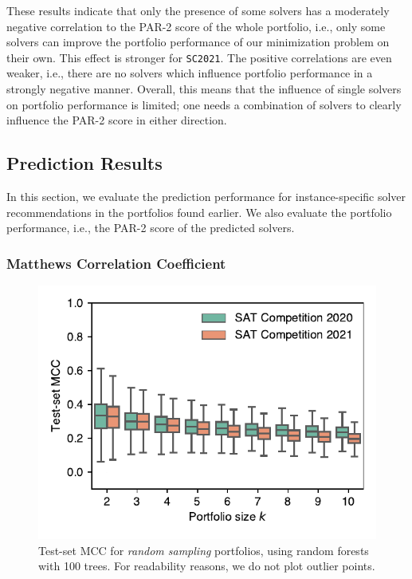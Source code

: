 \documentclass[conference]{IEEEtran}
\begin{document}
These results indicate that only the presence of some solvers has a moderately negative correlation to the PAR-2 score of the whole portfolio, i.e., only some solvers can improve the portfolio performance of our minimization problem on their own.
This effect is stronger for \texttt{SC2021}.
The positive correlations are even weaker, i.e., there are no solvers which influence portfolio performance in a strongly negative manner.
Overall, this means that the influence of single solvers on portfolio performance is limited; one needs a combination of solvers to clearly influence the PAR-2 score in either direction.

\subsection{Prediction Results}

In this section, we evaluate the prediction performance for instance-specific solver recommendations in the portfolios found earlier. 
We also evaluate the portfolio performance, i.e., the PAR-2 score of the predicted solvers.

\subsubsection{Matthews Correlation Coefficient}

\begin{figure}[t]
	\centering
	\includegraphics[width=.9\columnwidth]{plots/prediction-test-mcc.pdf}
	\caption{
		Test-set MCC for \emph{random sampling} portfolios, using random forests with 100 trees.
		For readability reasons, we do not plot outlier points.
	}
	\label{fig:prediction-test-mcc}
\end{figure}
\end{document}
